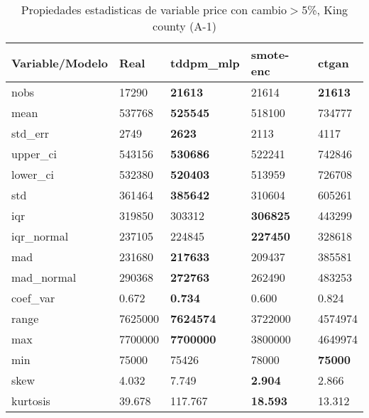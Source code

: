 \begin{table}[H]
\centering
\fontsize{8}{14}\selectfont
\caption{Propiedades estadisticas de variable price con cambio\ensuremath{>}5\%, King county (A-1)}
\label{table-stats-king county-a-1-price-short}
\begin{tabular}{|l|m{10em}|m{10em}|m{10em}|m{10em}|}
\hline
 \rowcolor[gray]{0.8}
Variable/Modelo & Real & tddpm\_mlp & smote-enc & ctgan \\
\hline nobs & 17290 & \bfseries 21613 & \cellcolor[rgb]{0.9, 0.54, 0.52} 21614 & \bfseries 21613 \\
\hline mean & 537768 & \bfseries 525545 & 518100 & \cellcolor[rgb]{0.9, 0.54, 0.52} 734777 \\
\hline std\_err & 2749 & \bfseries 2623 & 2113 & \cellcolor[rgb]{0.9, 0.54, 0.52} 4117 \\
\hline upper\_ci & 543156 & \bfseries 530686 & 522241 & \cellcolor[rgb]{0.9, 0.54, 0.52} 742846 \\
\hline lower\_ci & 532380 & \bfseries 520403 & 513959 & \cellcolor[rgb]{0.9, 0.54, 0.52} 726708 \\
\hline std & 361464 & \bfseries 385642 & 310604 & \cellcolor[rgb]{0.9, 0.54, 0.52} 605261 \\
\hline iqr & 319850 & 303312 & \bfseries 306825 & \cellcolor[rgb]{0.9, 0.54, 0.52} 443299 \\
\hline iqr\_normal & 237105 & 224845 & \bfseries 227450 & \cellcolor[rgb]{0.9, 0.54, 0.52} 328618 \\
\hline mad & 231680 & \bfseries 217633 & 209437 & \cellcolor[rgb]{0.9, 0.54, 0.52} 385581 \\
\hline mad\_normal & 290368 & \bfseries 272763 & 262490 & \cellcolor[rgb]{0.9, 0.54, 0.52} 483253 \\
\hline coef\_var & 0.672 & \bfseries 0.734 & 0.600 & \cellcolor[rgb]{0.9, 0.54, 0.52} 0.824 \\
\hline range & 7625000 & \bfseries 7624574 & \cellcolor[rgb]{0.9, 0.54, 0.52} 3722000 & 4574974 \\
\hline max & 7700000 & \bfseries 7700000 & \cellcolor[rgb]{0.9, 0.54, 0.52} 3800000 & 4649974 \\
\hline min & 75000 & 75426 & \cellcolor[rgb]{0.9, 0.54, 0.52} 78000 & \bfseries 75000 \\
\hline skew & 4.032 & \cellcolor[rgb]{0.9, 0.54, 0.52} 7.749 & \bfseries 2.904 & 2.866 \\
\hline kurtosis & 39.678 & \cellcolor[rgb]{0.9, 0.54, 0.52} 117.767 & \bfseries 18.593 & 13.312 \\

\end{tabular}
\end{table}
